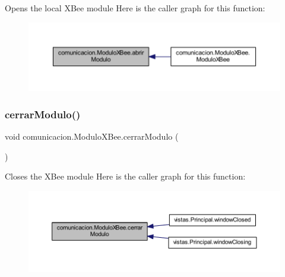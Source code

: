 Opens the local X\+Bee module Here is the caller graph for this function\+:
\nopagebreak
\begin{figure}[H]
\begin{center}
\leavevmode
\includegraphics[width=350pt]{classcomunicacion_1_1_modulo_x_bee_a2d5ad79e8571f3a2daaf66e3b5df4351_icgraph}
\end{center}
\end{figure}
\mbox{\label{classcomunicacion_1_1_modulo_x_bee_a4691476e52e74492bd9d9bc6919f0c4a}} 
\subsubsection{\texorpdfstring{cerrar\+Modulo()}{cerrarModulo()}}
{\footnotesize\ttfamily void comunicacion.\+Modulo\+X\+Bee.\+cerrar\+Modulo (\begin{DoxyParamCaption}{ }\end{DoxyParamCaption})}

Closes the X\+Bee module Here is the caller graph for this function\+:
\nopagebreak
\begin{figure}[H]
\begin{center}
\leavevmode
\includegraphics[width=350pt]{classcomunicacion_1_1_modulo_x_bee_a4691476e52e74492bd9d9bc6919f0c4a_icgraph}
\end{center}
\end{figure}
\mbox{\label{classcomunicacion_1_1_modulo_x_bee_aa9794310e90df8198dbcfc8aacaa1405}} 
